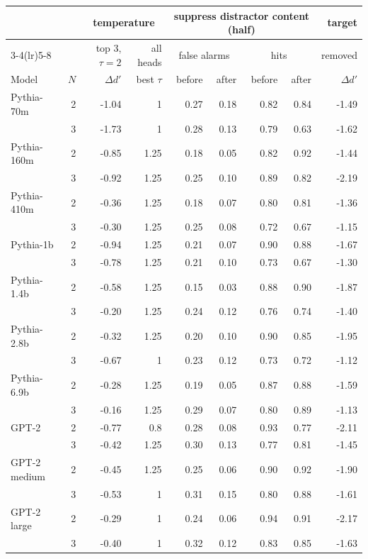 \begin{tabular}{lrrrrrrrr}
\toprule
& & \multicolumn{2}{c}{temperature} & \multicolumn{4}{c}{suppress distractor content (half)} & target \\
\cmidrule(lr){3-4}\cmidrule(lr){5-8}
& & top 3, $\tau{=}2$ & all heads & \multicolumn{2}{c}{false alarms} & \multicolumn{2}{c}{hits} & removed \\
Model & $N$ & $\Delta d'$ & best $\tau$ & before & after & before & after & $\Delta d'$ \\
\midrule
Pythia-70m & 2 & -1.04 & 1 & 0.27 & 0.18 & 0.82 & 0.84 & -1.49 \\
 & 3 & -1.73 & 1 & 0.28 & 0.13 & 0.79 & 0.63 & -1.62 \\
Pythia-160m & 2 & -0.85 & 1.25 & 0.18 & 0.05 & 0.82 & 0.92 & -1.44 \\
 & 3 & -0.92 & 1.25 & 0.25 & 0.10 & 0.89 & 0.82 & -2.19 \\
Pythia-410m & 2 & -0.36 & 1.25 & 0.18 & 0.07 & 0.80 & 0.81 & -1.36 \\
 & 3 & -0.30 & 1.25 & 0.25 & 0.08 & 0.72 & 0.67 & -1.15 \\
Pythia-1b & 2 & -0.94 & 1.25 & 0.21 & 0.07 & 0.90 & 0.88 & -1.67 \\
 & 3 & -0.78 & 1.25 & 0.21 & 0.10 & 0.73 & 0.67 & -1.30 \\
Pythia-1.4b & 2 & -0.58 & 1.25 & 0.15 & 0.03 & 0.88 & 0.90 & -1.87 \\
 & 3 & -0.20 & 1.25 & 0.24 & 0.12 & 0.76 & 0.74 & -1.40 \\
Pythia-2.8b & 2 & -0.32 & 1.25 & 0.20 & 0.10 & 0.90 & 0.85 & -1.95 \\
 & 3 & -0.67 & 1 & 0.23 & 0.12 & 0.73 & 0.72 & -1.12 \\
Pythia-6.9b & 2 & -0.28 & 1.25 & 0.19 & 0.05 & 0.87 & 0.88 & -1.59 \\
 & 3 & -0.16 & 1.25 & 0.29 & 0.07 & 0.80 & 0.89 & -1.13 \\
GPT-2 & 2 & -0.77 & 0.8 & 0.28 & 0.08 & 0.93 & 0.77 & -2.11 \\
 & 3 & -0.42 & 1.25 & 0.30 & 0.13 & 0.77 & 0.81 & -1.45 \\
GPT-2 medium & 2 & -0.45 & 1.25 & 0.25 & 0.06 & 0.90 & 0.92 & -1.90 \\
 & 3 & -0.53 & 1 & 0.31 & 0.15 & 0.80 & 0.88 & -1.61 \\
GPT-2 large & 2 & -0.29 & 1 & 0.24 & 0.06 & 0.94 & 0.91 & -2.17 \\
 & 3 & -0.40 & 1 & 0.32 & 0.12 & 0.83 & 0.85 & -1.63 \\

\end{tabular}
